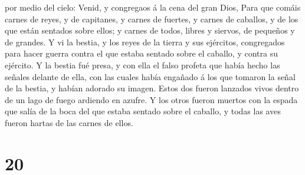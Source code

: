 por medio del cielo: Venid, y congregaos á la cena del gran Dios,
 Para que comáis carnes de reyes, y de capitanes, y
carnes de fuertes, y carnes de caballos, y de los que están sentados
sobre ellos; y carnes de todos, libres y siervos, de pequeños y de
grandes.  Y vi la bestia, y los reyes de la tierra y sus
ejércitos, congregados para hacer guerra contra el que estaba sentado
sobre el caballo, y contra su ejército.  Y la bestia fué
presa, y con ella el falso profeta que había hecho las señales delante
de ella, con las cuales había engañado á los que tomaron la señal de la
bestia, y habían adorado su imagen. Estos dos fueron lanzados vivos
dentro de un lago de fuego ardiendo en azufre.  Y los
otros fueron muertos con la espada que salía de la boca del que estaba
sentado sobre el caballo, y todas las aves fueron hartas de las carnes
de ellos.

\hypertarget{section-19}{%
\section{20}\label{section-19}}

